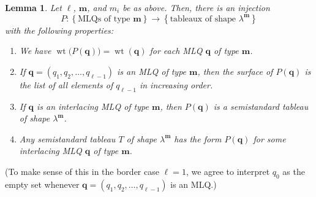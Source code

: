 \documentclass[reqno]{amsart}
\newcommand{\0}{\phantom{c}}
\DeclareMathOperator{\wt}{wt} %
\newcommand{\mm}{\mathbf{m}}
\newcommand{\qq}{\mathbf{q}}
\newcommand{\set}[1]{\left\{ #1 \right\}}
\newcommand{\tup}[1]{\left( #1 \right)}
\theoremstyle{plain}
\newtheorem{lemma}[thm]{Lemma}
\theoremstyle{definition}
\numberwithin{equation}{section}
\begin{document}
\begin{lemma}
\label{lem:determinant_form.bij1}
Let $\ell$, $\mm$, and $m_i$ be as above.
Then, there is an injection
\[
P \colon \set{ \text{MLQs of type } \mm } \to \set{ \text{tableaux of shape } \lambda^{\mm} }
\]
with the following properties:
\begin{enumerate}
\item[(a)] We have $\wt\bigl(  P(\qq) \bigr) = \wt(\qq)$ for each MLQ $\qq$ of type $\mm$.

\item[(b)] If $\qq = \tup{q_1, q_2, \dotsc, q_{\ell-1}}$ is an MLQ of type $\mm$, then the surface of $P(\qq)$ is the list of all elements of $q_{\ell-1}$ in increasing order.

\item[(c)] If $\qq$ is an interlacing MLQ of type $\mm$, then $P(\qq)$ is a semistandard tableau of shape $\lambda^{\mm}$.

\item[(d)] Any semistandard tableau $T$ of shape $\lambda^{\mm}$ has the form $P(\qq)$ for some interlacing MLQ $\qq$ of type $\mm$.
\end{enumerate}
\end{lemma}

(To make sense of this in the border case $\ell = 1$, we agree to interpret $q_0$ as the empty set whenever $\qq = \tup{q_1, q_2, \dotsc, q_{\ell-1}}$ is an MLQ.)
\end{document}
